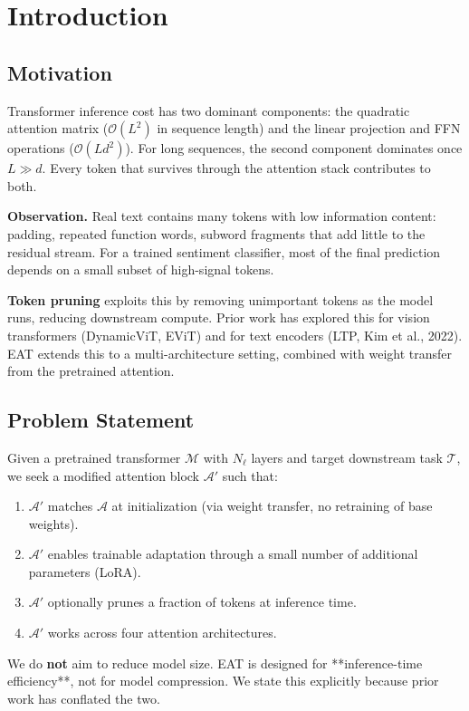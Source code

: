 
\section{Introduction}

\subsection{Motivation}

Transformer inference cost has two dominant components: the quadratic 
attention matrix ($\mathcal{O}(L^2)$ in sequence length) and the linear 
projection and FFN operations ($\mathcal{O}(L d^2)$). For long sequences, 
the second component dominates once $L \gg d$. Every token that survives 
through the attention stack contributes to both.

\textbf{Observation.} Real text contains many tokens with low information content: 
padding, repeated function words, subword fragments that add little to the 
residual stream. For a trained sentiment classifier, most of the final 
prediction depends on a small subset of high-signal tokens.

\textbf{Token pruning} exploits this by removing unimportant tokens as the model 
runs, reducing downstream compute. Prior work has explored this for vision 
transformers (DynamicViT, EViT) and for text encoders (LTP, Kim et al., 2022). 
EAT extends this to a multi-architecture setting, combined with weight 
transfer from the pretrained attention.

\subsection{Problem Statement}

Given a pretrained transformer $\mathcal{M}$ with $N_\ell$ layers and target 
downstream task $\mathcal{T}$, we seek a modified attention block $\mathcal{A}'$ 
such that:

\begin{enumerate}
\item $\mathcal{A}'$ matches $\mathcal{A}$ at initialization (via weight
  transfer, no retraining of base weights).
\item $\mathcal{A}'$ enables trainable adaptation through a small number of
  additional parameters (LoRA).
\item $\mathcal{A}'$ optionally prunes a fraction of tokens at inference time.
\item $\mathcal{A}'$ works across four attention architectures.

\end{enumerate}
We do \textbf{not} aim to reduce model size. EAT is designed for **inference-time 
efficiency**, not for model compression. We state this explicitly because 
prior work has conflated the two.

